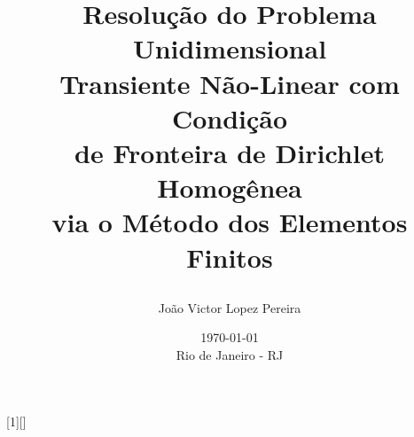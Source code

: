 \usepackage[brazil]{babel}                %
\usepackage[utf8]{inputenc}               %
\usepackage[T1]{fontenc}                  %

\usepackage{graphicx}                     %
\usepackage{float}                        %

\usepackage{tocloft}                      %
\usepackage{hyperref}                     %
\usepackage{csquotes}                     %
\usepackage[backend=biber]{biblatex}      %
\graphicspath{{figures/}}                 %

\usepackage{cancel}
\usepackage[top=1in, bottom=1in, left=0.5in, right=0.5in]{geometry}
\usepackage{amsmath, amssymb}             %
\usepackage{fancyvrb}                     %
\usepackage{upquote}                      %
\usepackage{indentfirst}                  %
\usepackage{listings}                     %
\setlength{\parskip}{\baselineskip}       %
\setlength{\footnotesep}{0.8em}           %
\setlength{\skip\footins}{2em}            %
\setlength{\cftbeforechapskip}{12pt}      %
\setlength{\cftbeforesecskip}{6pt}        %
\setlength{\jot}{10pt}

\title{
  Resolução do Problema Unidimensional \\
  Transiente Não-Linear com Condição \\
  de Fronteira de Dirichlet Homogênea \\
  via o Método dos Elementos Finitos

}

\date{
  \today\\
  \vfill
  Rio de Janeiro - RJ
}

\author{
  João Victor Lopez Pereira
}

[1][]{             %
  \lstset{
    basicstyle=\ttfamily,
    columns=flexible,                      %
    breaklines=true,
    breakatwhitespace=true,
    frame=none,
    basewidth=0.5em,                       %
    aboveskip=13pt,
    belowskip=0pt,
    #1
  }
}{}

